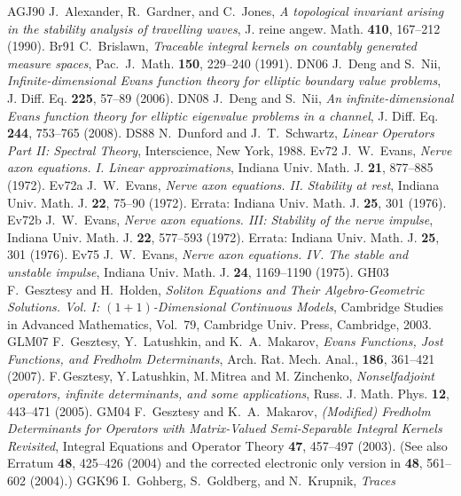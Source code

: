 \begin{thebibliography}{99}
{\bibitem}{AGJ90} J.\ Alexander, R.\ Gardner, and C.\ Jones,
{\em A topological invariant arising in the stability analysis of
travelling waves}, J. reine angew. Math. {\bf 410}, 167--212 (1990).
{\bibitem}{Br91} C.\ Brislawn, {\it Traceable integral kernels on countably generated 
measure spaces}, Pac.\ J.\ Math. {\bf 150}, 229--240 (1991). 
{\bibitem}{DN06} J.\ Deng and S.\  Nii,
{\it Infinite-dimensional Evans function theory for
elliptic boundary value problems},
J. Diff. Eq. {\bf 225}, 57--89 (2006).
{\bibitem}{DN08} J.\ Deng and S.\  Nii,
{\it An infinite-dimensional Evans function theory for
elliptic eigenvalue problems in a channel},
J. Diff. Eq. {\bf 244}, 753--765 (2008).
{\bibitem}{DS88} N.~Dunford and J.~T.~Schwartz, {\it Linear Operators Part II:
Spectral Theory}, Interscience, New York, 1988.
{\bibitem}{Ev72} J.\ W.\ Evans, {\it Nerve axon equations. I. Linear
approximations}, Indiana Univ. Math. J. {\bf 21}, 877--885 (1972).
{\bibitem}{Ev72a} J.\ W.\ Evans, {\it Nerve axon equations. II. Stability at
rest}, Indiana Univ. Math. J. {\bf 22}, 75--90 (1972).  Errata: Indiana
Univ. Math. J. {\bf 25}, 301 (1976).
{\bibitem}{Ev72b} J.\ W.\ Evans, {\it Nerve axon equations. III: Stability of the
nerve impulse}, Indiana Univ. Math. J. {\bf 22}, 577--593 (1972).
Errata:  Indiana Univ. Math. J. {\bf 25}, 301 (1976).
{\bibitem}{Ev75} J.\ W.\ Evans, {\it Nerve axon equations. IV. The stable and
unstable impulse}, Indiana Univ. Math. J. {\bf 24}, 1169--1190 (1975).
{\bibitem}{GH03} F.\ Gesztesy and H.\ Holden, {\it Soliton Equations and
Their Algebro-Geometric Solutions. Vol. I: $(1+1)$-Dimensional
Continuous Models},  Cambridge Studies in Advanced Mathematics,
Vol.\ 79, Cambridge Univ. Press, Cambridge, 2003.
{\bibitem}{GLM07} F.\ Gesztesy, Y.\ Latushkin, and K.\ A.\ Makarov, {\it
Evans Functions, Jost Functions, and Fredholm Determinants},
Arch. Rat. Mech. Anal., {\bf 186},  361--421 (2007).
 F.\,Gesztesy, Y.\,Latushkin, M.\,Mitrea and M. Zinchenko,
{\it Nonselfadjoint operators, infinite determinants, and some
applications}, Russ. J. Math. Phys. {\bf 12}, 443--471 (2005).
{\bibitem}{GM04} F.\ Gesztesy and K.\ A.\ Makarov, {\it (Modified) Fredholm
Determinants for Operators with Matrix-Valued Semi-Separable Integral
Kernels Revisited}, Integral Equations and Operator Theory {\bf 47}, 457--497
(2003). (See also Erratum {\bf 48}, 425--426 (2004) and the corrected
electronic
only version in {\bf 48}, 561--602  (2004).)
{\bibitem}{GGK96} I.\ Gohberg, S.\ Goldberg, and N.\ Krupnik, {\it Traces
}
\end{thebibliography}
